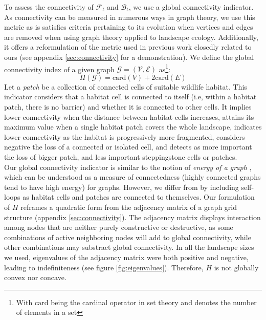 To assess the connectivity of $\mathcal{F}_t$ and $\mathcal{B}_t$, we use a global connectivity indicator. As connectivity can be measured in numerous ways in graph theory, we use this metric as is satisfies criteria pertaining to its evolution when vertices and edges are removed \citep{pascual-hortal_comparison_2006} when using graph theory applied to landscape ecology. Additionally, it offers a reformulation of the metric used in previous work closedly related to ours \citep{minas_spatial_2014, rachmawati_optimisation_2016} (see appendix \ref{sec:connectivity} for a demonstration). We define the global connectivity index of a given graph $\mathcal{G} = (\mathcal{V}, \mathcal{E})$ as\footnote{With $\mathrm{card}$ being the cardinal operator in set theory and denotes the number of elements in a set}:
\begin{equation}
H(\mathcal{G}) = \mathrm{card}(V) + 2\mathrm{card}(E)
\label{eq:high_connectivity}
\end{equation} 
Let a \textit{patch} be a collection of connected cells of suitable wildlife habitat.
This indicator considers that a habitat cell is connected to itself (i.e, within a habitat patch, there is no barrier) and whether it is connected to other cells.  
It implies lower connectivity when the distance between habitat cells increases, attains its maximum value when a single habitat patch covers the whole landscape, indicates lower connectivity as the habitat is progressively more fragmented, considers negative the loss of a connected or isolated cell, and detects as more important the loss of bigger patch, and less important steppingstone cells or patches. 
\\
Our global connectivity indicator is similar to the notion of \textit{energy of a graph} \citep{gutman_energy_2001}, which can be understood as a measure of connectedness (highly connected graphs tend to have high energy) for graphs. However, we differ from \cite{gutman_energy_2001} by including self-loops as habitat cells and patches are connected to themselves. Our formulation of $H$ reframes a quadratic form from the adjacency matrix of a graph grid structure (appendix \ref{sec:connectivity}). The adjacency matrix displays interaction among nodes that are neither purely constructive or destructive, as some combinations of active neighboring nodes will add to global connectivity, while other combinations may substract global connectivity. In all the landscape sizes we used, eigenvalues of the adjacency matrix were both positive and negative, leading to indefiniteness (see figure \ref{fig:eigenvalues}). Therefore, $H$ is not globally convex nor concave. 
